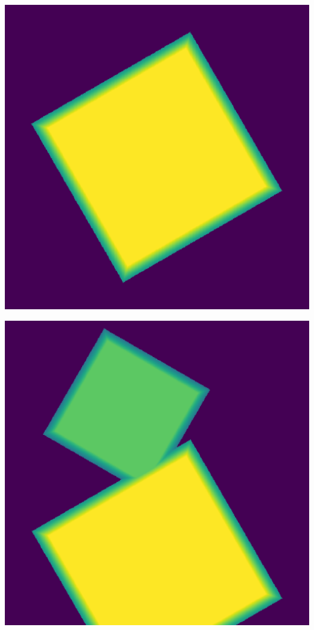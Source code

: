 \documentclass{article}
\begin{document}
\begin{center}
    \begin{minipage}{0.3\textwidth}
        \includegraphics*[width=\linewidth]{../images/nanosheet_singola.png}
    \end{minipage}
    \hfill
    \begin{minipage}{0.3\textwidth}
        \includegraphics*[width=\linewidth]{../images/nanosheet_doppia.png}

\end{minipage}
\end{center}
\end{document}
